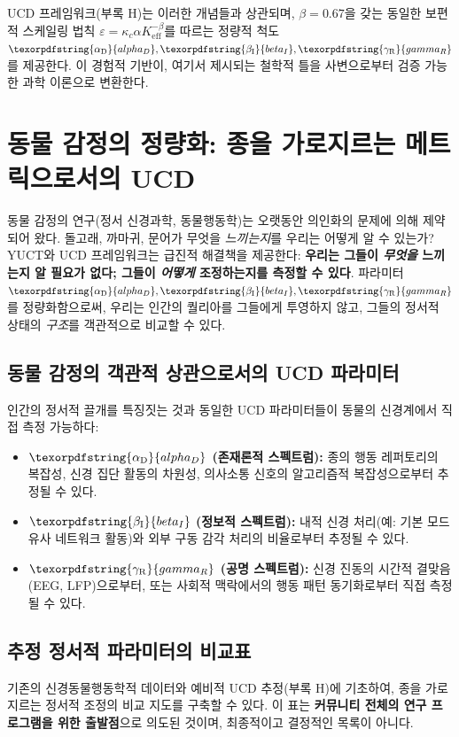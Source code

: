 \documentclass[12pt,a4paper]{article}
\DeclareRobustCommand{\alD}{\texorpdfstring{\ensuremath{\alpha_{\mathrm{D}}}}{alpha_D}}
\DeclareRobustCommand{\beI}{\texorpdfstring{\ensuremath{\beta_{\mathrm{I}}}}{beta_I}}
\DeclareRobustCommand{\gaR}{\texorpdfstring{\ensuremath{\gamma_{\mathrm{R}}}}{gamma_R}}
\newcommand{\eff}{\mathrm{eff}}
\newcommand{\Ke}{K_{\eff}}
\begin{document}
	UCD 프레임워크(부록 H)는 이러한 개념들과 상관되며, \(\beta = 0.67\)을 갖는 동일한 보편적 스케일링 법칙 \(\varepsilon = \kappa_c \alpha \Ke^{-\beta}\)를 따르는 정량적 척도 \(\alD, \beI, \gaR\)를 제공한다. 이 경험적 기반이, 여기서 제시되는 철학적 틀을 사변으로부터 검증 가능한 과학 이론으로 변환한다.
	
	\section{동물 감정의 정량화: 종을 가로지르는 메트릭으로서의 UCD}
	
	동물 감정의 연구(정서 신경과학, 동물행동학)는 오랫동안 의인화의 문제에 의해 제약되어 왔다. 돌고래, 까마귀, 문어가 무엇을 \textit{느끼는지}를 우리는 어떻게 알 수 있는가? YUCT와 UCD 프레임워크는 급진적 해결책을 제공한다: \textbf{우리는 그들이 \textit{무엇을} 느끼는지 알 필요가 없다; 그들이 \textit{어떻게} 조정하는지를 측정할 수 있다}. 파라미터 \(\alD, \beI, \gaR\)를 정량화함으로써, 우리는 인간의 퀄리아를 그들에게 투영하지 않고, 그들의 정서적 상태의 \textit{구조}를 객관적으로 비교할 수 있다.
	
	\subsection{동물 감정의 객관적 상관으로서의 UCD 파라미터}
	
	인간의 정서적 끌개를 특징짓는 것과 동일한 UCD 파라미터들이 동물의 신경계에서 직접 측정 가능하다:
	
	\begin{itemize}
		\item \textbf{\(\alD\) (존재론적 스펙트럼):} 종의 행동 레퍼토리의 복잡성, 신경 집단 활동의 차원성, 의사소통 신호의 알고리즘적 복잡성으로부터 추정될 수 있다.
		\item \textbf{\(\beI\) (정보적 스펙트럼):} 내적 신경 처리(예: 기본 모드 유사 네트워크 활동)와 외부 구동 감각 처리의 비율로부터 추정될 수 있다.
		\item \textbf{\(\gaR\) (공명 스펙트럼):} 신경 진동의 시간적 결맞음(EEG, LFP)으로부터, 또는 사회적 맥락에서의 행동 패턴 동기화로부터 직접 측정될 수 있다.
	\end{itemize}
	
	\subsection{추정 정서적 파라미터의 비교표}
	
	기존의 신경동물행동학적 데이터와 예비적 UCD 추정(부록 H)에 기초하여, 종을 가로지르는 정서적 조정의 비교 지도를 구축할 수 있다. 이 표는 \textbf{커뮤니티 전체의 연구 프로그램을 위한 출발점}으로 의도된 것이며, 최종적이고 결정적인 목록이 아니다.
	
\end{document}
